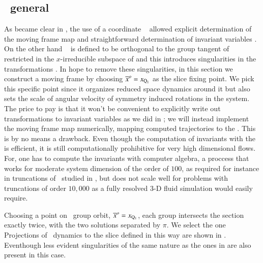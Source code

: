 
\subsection{\label{s:mfReqb}\CLe\  general \slice}

As became clear in , the use of a coordinate \slice\ 
allowed explicit determination of the moving frame map  and straightforward
determination of invariant variables .
On the other hand \slice\  is defined to be orthogonal
to the group tangent of  restricted in the $x$-irreducible subspace of 
and this introduces singularities in the transformations .
In hope to remove these singularities, in this section we construct a moving frame 
by choosing ${\overline{x}^o}=x_{\mathrm{Q}_{1}}$ as the slice fixing point. We pick this
specific point since it organizes reduced space dynamics around it but also sets the
scale of angular velocity of symmetry induced rotations in the system.
The price to pay is that it won't be convenient to explicitly write out 
transformations to invariant variables
as we did in ; we will instead implement the moving frame map numerically,
mapping computed trajectories to the \slice.
This is by no means a drawback. Even though the computation of invariants with the
{\mframes} is efficient, it is still computationally
prohibitive for very high dimensional flows. For, one has
to compute the invariants with computer algebra, a proccess
that works for moderate system dimension of the order of $100$,
as required for instance in truncations of \KSe\ studied in ,
but does not scale well for problems with truncations of order $10,000$ as
a fully resolved $3$-D fluid simulation would easily require.


Choosing a point on \reqv\ group orbit,
${\overline{x}^o}  = x_{\mathrm{Q}_{1}}$,
each group intersects the section exactly twice,  with the
two solutions separated by $\pi$. We select the one 
 
Projections of \cLe\ dynamics to the slice defined in this way are
shown in \reffig{fig:CLEmfReqb1}. Eventhough less evident singularities
of the same nature as the ones in \refsect{s:cLeCoordMF} are also present in
this case. 



